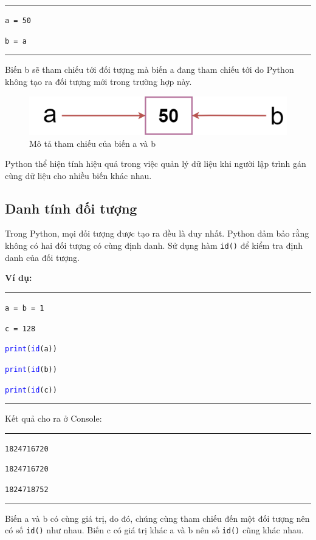 \rule{\linewidth}{0.2mm}\par
\texttt{a = 50}\par
\texttt{b = a}\\
\rule{\linewidth}{0.2mm}\par
Biến b sẽ tham chiếu tới đối tượng mà biến a đang tham chiếu tới do Python không tạo ra đối tượng mới trong trường hợp này.
\begin{figure}[h]
	\centering
	\includegraphics[width=0.7\linewidth]{img/ref2}
	\caption{Mô tả tham chiếu của biến a và b}
\end{figure}\par
Python thể hiện tính hiệu quả trong việc quản lý dữ liệu khi người lập trình gán cùng dữ liệu cho nhiều biến khác nhau.
\newpage
\subsection{Danh tính đối tượng}
Trong Python, mọi đối tượng được tạo ra đều là duy nhất. Python đảm bảo rằng không có hai đối tượng có cùng định danh. Sử dụng hàm \texttt{id()} để kiểm tra định danh của đối tượng.\par
\textbf{Ví dụ:}\\
\rule{\linewidth}{0.2mm}\par
\begin{linenumbers}
	\texttt{a = b = 1}\par
	\texttt{c = 128}\par
	\texttt{\textcolor{blue}{print}(\textcolor{blue}{id}(a))}\par
	\texttt{\textcolor{blue}{print}(\textcolor{blue}{id}(b))}\par
	\texttt{\textcolor{blue}{print}(\textcolor{blue}{id}(c))}\par
\end{linenumbers}
\rule{\linewidth}{0.2mm}\par
\noindent
\resetlinenumber
Kết quả cho ra ở Console:\\
\rule{\linewidth}{0.2mm}\par
\begin{linenumbers}
	\texttt{1824716720}\par
	\texttt{1824716720}\par
	\texttt{1824718752}
\end{linenumbers}
\rule{\linewidth}{0.2mm}\par
\resetlinenumber
Biến a và b có cùng giá trị, do đó, chúng cùng tham chiếu đến một đối tượng nên có số \texttt{id()} như nhau. Biến c có giá trị khác a và b nên số \texttt{id()} cũng khác nhau.
\newpage
